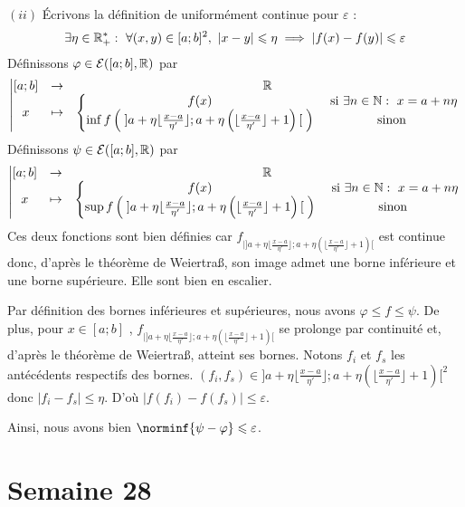 \documentclass{article}
\renewenvironment{question_kholle}[2][ ]
{
	\subsection{\texorpdfstring{#2}{}}
	\notblank{#1}
	{
		\noindent #1
		\bigbreak
	}
	{}
	\begin{proof}
}
{
	\end{proof}
}
\begin{document}
\begin{question_kholle}
		$(ii)$ Écrivons la définition de uniformément continue pour $\varepsilon$ :
		\begin{equation*}
			\exists \eta \in \mathbb R_ +^* : \ \forall (x, y) \in [a;b]^2, \
			|x - y| \leqslant \eta \implies |f(x) - f(y)| \leqslant \varepsilon
		\end{equation*}
		Définissons $\varphi \in \mathcal{E}({[a;b]}, \mathbb R)$ par
		\begin{equation*}
			\left| \begin{matrix}
				[a;b] &\rightarrow& \mathbb R \\
				x &\mapsto& \left\{ \begin{matrix}
					f(x) &\text{ si } \exists n \in \mathbb N : \ x = a + n \eta \\
					\inf f\left( \; ]a + \eta \lfloor \frac{x-a}{\eta'} \rfloor; a + \eta \left( \lfloor \frac{x-a}{\eta'} \rfloor + 1 \right) [ \; \right) &\text{ sinon }
				\end{matrix} \right.
			\end{matrix} \right.
		\end{equation*}
		Définissons $\psi \in \mathcal{E}({[a;b]}, \mathbb R)$ par
		\begin{equation*}
			\left| \begin{matrix}
				[a;b] &\rightarrow& \mathbb R \\
				x &\mapsto& \left\{ \begin{matrix}
					f(x) &\text{ si } \exists n \in \mathbb N : \ x = a + n \eta \\
					\sup f\left( \; ] a + \eta \lfloor \frac{x-a}{\eta'} \rfloor; a + \eta \left( \lfloor \frac{x-a}{\eta'} \rfloor + 1\right)[ \; \right) &\text{ sinon }
				\end{matrix} \right.
			\end{matrix} \right.
		\end{equation*}
		Ces deux fonctions sont bien définies car $f_{|] a + \eta \lfloor \frac{x-a}{\eta'} \rfloor; a + \eta \left( \lfloor \frac{x-a}{\eta'} \rfloor + 1\right)[}$ est continue donc, d'après le théorème de Weiertraß, son image admet une borne inférieure et une borne supérieure.
		Elle sont bien en escalier.
		
		Par définition des bornes inférieures et supérieures, nous avons $\varphi \leqslant f \leqslant \psi$.
		De plus, pour $x \in [a;b]$ \fq, $f_{|] a + \eta \lfloor \frac{x-a}{\eta'} \rfloor; a + \eta \left( \lfloor \frac{x-a}{\eta'} \rfloor + 1\right)[}$ se prolonge par continuité et, d'après le théorème de Weiertraß, atteint ses bornes. Notons $f_i$ et $f_s$ les antécédents respectifs des bornes.
		$(f_i, f_s) \in ] a + \eta \lfloor \frac{x-a}{\eta'} \rfloor; a + \eta \left( \lfloor \frac{x-a}{\eta'} \rfloor + 1\right)[ ^2$ donc $\left|f_i - f_s\right| \leqslant \eta$.
		D'où $\left| f(f_i) - f(f_s) \right| \leqslant \varepsilon$.
		
		Ainsi, nous avons bien $\norminf{\psi - \varphi} \leqslant \varepsilon$.
	\end{question_kholle}
\pagebreak\section{Semaine 28}
\end{document}
